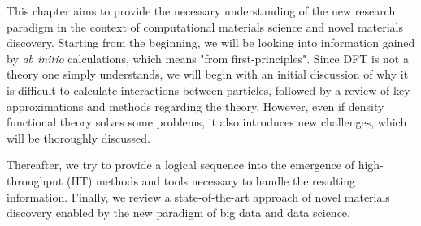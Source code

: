 This chapter aims to provide the necessary understanding of the new research paradigm in the context of computational materials science and novel materials discovery. Starting from the beginning, we will be looking into information gained by \textit{ab initio} calculations, which means "from first-principles". %
Since DFT is not a theory one simply understands, we will begin with an initial discussion of why it is difficult to calculate interactions between particles, followed by a review of key approximations and methods regarding the theory. However, even if density functional theory solves some problems, it also introduces new challenges, which will be thoroughly discussed.

Thereafter, we try to provide a logical sequence into the emergence of high-throughput (HT) methods and tools necessary to handle the resulting information. Finally, we review a state-of-the-art approach of novel materials discovery enabled by the new paradigm of big data and data science.

